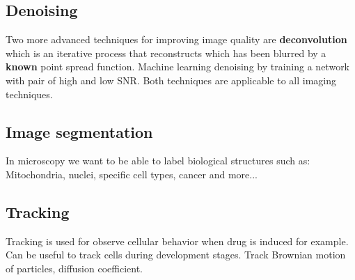	\subsection*{Denoising}
	Two more advanced techniques for improving image quality are \textbf{deconvolution} which is an iterative process that reconstructs which has been blurred by a \textbf{known} point spread function. Machine learning denoising by training a network with pair of high and low SNR. Both techniques are applicable to all imaging techniques. 

	\subsection*{Image segmentation}
	In microscopy we want to be able to label biological structures such as: Mitochondria, nuclei, specific cell types, cancer and more... 

	\subsection*{Tracking}
	Tracking is used for observe cellular behavior when drug is induced for example. Can be useful to track cells during development stages. Track Brownian motion of particles, diffusion coefficient. 	
	  







